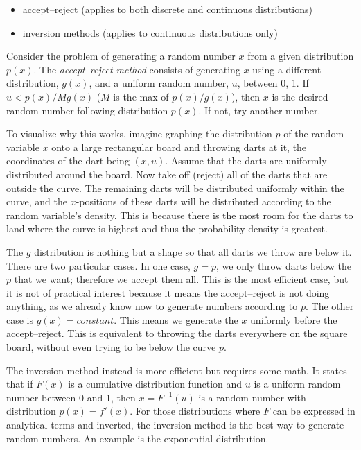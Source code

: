 \documentclass[justified, sixbynine]{tufte-book}
\theoremstyle{plain}%
\newtheorem * {corollary}{Corollary}
\theoremstyle{definition}
\theoremstyle{remark}
\newtheorem * {remark}{Remark}
\newtheorem * {note}{Note}
\begin{document}
\begin{fullwidth}
\begin{itemize}
\item accept--reject (applies to both discrete and continuous distributions)
\item inversion methods (applies to continuous distributions only)
\end{itemize}

Consider the problem of generating a random number $x$ from a given distribution $p(x)$. The {\it accept--reject method} consists of generating $x$ using a different distribution, $g(x)$, and a uniform random number, $u$, between 0, 1. If $u<p(x)/Mg(x)$ ($M$ is the max of $p(x)/g(x)$), then $x$ is the desired random number following distribution $p(x)$. If not, try another number.

To visualize why this works, imagine graphing the distribution $p$ of the random variable $x$ onto a large rectangular board and throwing darts at it, the coordinates of the dart being $(x, u)$. Assume that the darts are uniformly distributed around the board. Now take off (reject) all of the darts that are outside the curve. The remaining darts will be distributed uniformly within the curve, and the $x$-positions of these darts will be distributed according to the random variable's density. This is because there is the most room for the darts to land where the curve is highest and thus the probability density is greatest.

The $g$ distribution is nothing but a shape so that all darts we throw are below it. There are two particular cases. In one case, $g=p$, we only throw darts below the $p$ that we want; therefore we accept them all. This is the most efficient case, but it is not of practical interest because it means the accept--reject is not doing anything, as we already know now to generate numbers according to $p$. The other case is $g(x) = constant$. This means we generate the $x$ uniformly before the accept--reject. This is equivalent to throwing the darts everywhere on the square board, without even trying to be below the curve $p$.

The inversion method instead is more efficient but requires some math. It states that if $F(x)$ is a cumulative distribution function and $u$ is a uniform random number between 0 and 1, then $x = F^{-1}(u)$ is a random number with distribution $p(x)=f'(x)$. For those distributions where $F$ can be expressed in analytical terms and inverted, the inversion method is the best way to generate random numbers. An example is the exponential distribution.


\end{fullwidth}
\end{document}
